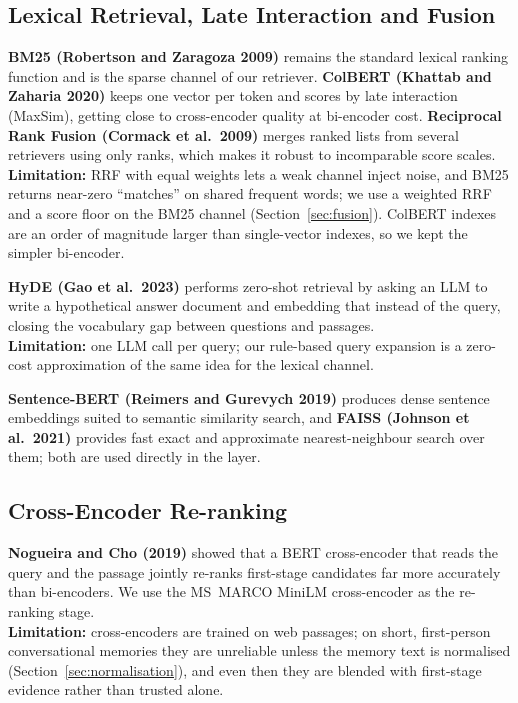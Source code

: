 \subsection{Lexical Retrieval, Late Interaction and Fusion}
\textbf{BM25 (Robertson and Zaragoza 2009)} \cite{bm25} remains the standard lexical ranking function and is
the sparse channel of our retriever. \textbf{ColBERT (Khattab and Zaharia 2020)} \cite{colbert} keeps one
vector per token and scores by late interaction (MaxSim), getting close to cross-encoder quality at
bi-encoder cost. \textbf{Reciprocal Rank Fusion (Cormack et al.\ 2009)} \cite{rrf} merges ranked lists from
several retrievers using only ranks, which makes it robust to incomparable score scales. \\
\textbf{Limitation:} RRF with equal weights lets a weak channel inject noise, and BM25 returns near-zero
``matches'' on shared frequent words; we use a weighted RRF and a score floor on the BM25 channel
(Section~\ref{sec:fusion}). ColBERT indexes are an order of magnitude larger than single-vector indexes,
so we kept the simpler bi-encoder.

\textbf{HyDE (Gao et al.\ 2023)} \cite{hyde} performs zero-shot retrieval by asking an LLM to write a
hypothetical answer document and embedding that instead of the query, closing the vocabulary gap between
questions and passages. \\
\textbf{Limitation:} one LLM call per query; our rule-based query expansion is a zero-cost approximation
of the same idea for the lexical channel.

\textbf{Sentence-BERT (Reimers and Gurevych 2019)} \cite{sbert} produces dense sentence embeddings suited to
semantic similarity search, and \textbf{FAISS (Johnson et al.\ 2021)} \cite{faiss} provides fast exact and
approximate nearest-neighbour search over them; both are used directly in the layer.

\subsection{Cross-Encoder Re-ranking}
\textbf{Nogueira and Cho (2019)} \cite{nogueira2019} showed that a BERT cross-encoder that reads the query
and the passage jointly re-ranks first-stage candidates far more accurately than bi-encoders. We use the
MS~MARCO MiniLM cross-encoder as the re-ranking stage. \\
\textbf{Limitation:} cross-encoders are trained on web passages; on short, first-person conversational
memories they are unreliable unless the memory text is normalised (Section~\ref{sec:normalisation}), and
even then they are blended with first-stage evidence rather than trusted alone.

